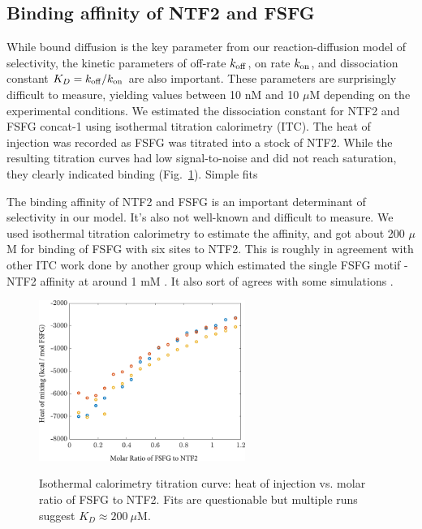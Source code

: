 \subsection{Binding affinity of NTF2 and FSFG}
While bound diffusion is the key parameter from our reaction-diffusion model of selectivity, the kinetic parameters of off-rate $k_{\rm off}$, on rate $k_{\rm on}$, and dissociation constant $K_D = k_{\rm off}/k_{\rm on}$ are also important. These parameters are surprisingly difficult to measure, yielding values between 10 nM and 10 $\mu$M depending on the experimental conditions.  We estimated the dissociation constant for NTF2 and FSFG concat-1 using isothermal titration calorimetry (ITC).  The heat of injection was recorded as FSFG was titrated into a stock of NTF2.  While the resulting titration curves had low signal-to-noise and did not reach saturation, they clearly indicated binding (Fig.~\ref{fig:ITC-runs}).  Simple fits


The binding affinity of NTF2 and FSFG is an important determinant of selectivity in our model.  It's also not well-known and difficult to measure.  We used isothermal titration calorimetry to estimate the affinity, and got about 200 $\mu$M for binding of FSFG with six sites to NTF2.  This is roughly in agreement with other ITC work done by another group which estimated the single FSFG motif - NTF2 affinity at around 1 mM \cite{rout paper}.  It also sort of agrees with some simulations \cite{milles15}.

\begin{figure}
\caption{Isothermal calorimetry titration curve: heat of injection vs. molar ratio of FSFG to NTF2. Fits are questionable but multiple runs suggest $K_D \approx 200\ \mu$M.\\}
\centering
\includegraphics[width=0.6\textwidth]{figs/ch04/ITC_runs}
\label{fig:ITC-runs}
\end{figure} 


